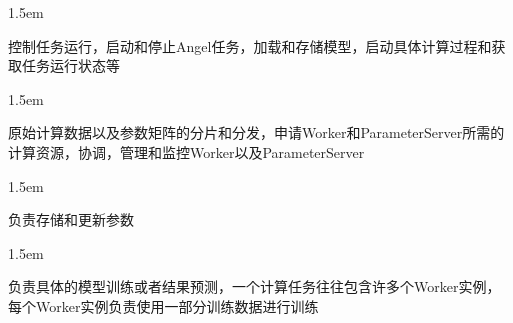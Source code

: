 \documentclass{article}
\begin{document}
\begin{mddefinitions}%


\begin{mdbmarginx}{}{}{}{1.5em}%
\begin{mddefdata}%
\hspace*{1em}\hspace*{1em}控制任务运行，启动和停止Angel任务，加载和存储模型，启动具体计算过程和获取任务运行状态等
\end{mddefdata}%
\end{mdbmarginx}%


\begin{mdbmarginx}{}{}{}{1.5em}%
\begin{mddefdata}%
\hspace*{1em}\hspace*{1em}原始计算数据以及参数矩阵的分片和分发，申请Worker和ParameterServer所需的计算资源，协调，管理和监控Worker以及ParameterServer
\end{mddefdata}%
\end{mdbmarginx}%


\begin{mdbmarginx}{}{}{}{1.5em}%
\begin{mddefdata}%
\hspace*{1em}\hspace*{1em}负责存储和更新参数
\end{mddefdata}%
\end{mdbmarginx}%


\begin{mdbmarginx}{}{}{}{1.5em}%
\begin{mddefdata}%
\hspace*{1em}\hspace*{1em}负责具体的模型训练或者结果预测，一个计算任务往往包含许多个Worker实例，每个Worker实例负责使用一部分训练数据进行训练%
\end{mddefdata}%
\end{mdbmarginx}%
\end{mddefinitions}%
\end{document}
